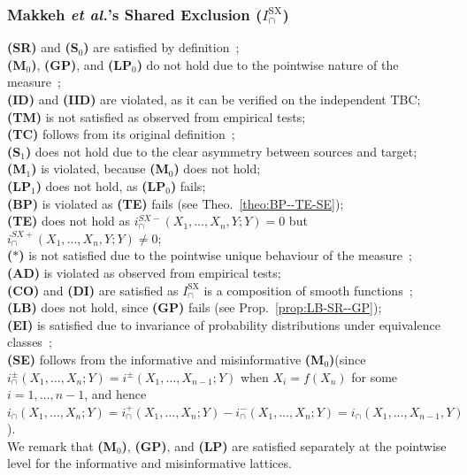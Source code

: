 \documentclass{article}
\makeatletter
\newcommand{\etalx}{\textit{et al.\@}\xspace}
\newcommand{\ts}[1]{\ensuremath{_{\text{#1}}}}
\newcommand{\Xs}{X_1,\ldots,X_n}
\newcommand{\Xsm}{X_1,\ldots,X_{n-1}}
\newcommand{\SR}{\textbf{(SR)}\xspace} %
\newcommand{\Sz}{\textbf{(S\ts{0})}\xspace} %
\newcommand{\Mz}{\textbf{(M\ts{0})}\xspace} %
\newcommand{\GP}{\textbf{(GP)}\xspace} %
\newcommand{\LPz}{\textbf{(LP\ts{0})}\xspace} %
\newcommand{\ID}{\textbf{(ID)}\xspace} %
\newcommand{\IID}{\textbf{(IID)}\xspace} %
\newcommand{\TM}{\textbf{(TM)}\xspace} %
\newcommand{\TC}{\textbf{(TC)}\xspace} %
\newcommand{\So}{\textbf{(S\ts{1})}\xspace} %
\newcommand{\Mo}{\textbf{(M\ts{1})}\xspace} %
\newcommand{\LPo}{\textbf{(LP\ts{1})}\xspace} %
\newcommand{\BP}{\textbf{(BP)}\xspace} %
\newcommand{\TE}{\textbf{(TE)}\xspace} %
\newcommand{\AST}{\textbf{($\boldsymbol{\ast}$)}\xspace} %
\newcommand{\AD}{\textbf{(AD)}\xspace} %
\newcommand{\CO}{\textbf{(CO)}\xspace} %
\newcommand{\LB}{\textbf{(LB)}\xspace} %
\newcommand{\EI}{\textbf{(EI)}\xspace} %
\newcommand{\SE}{\textbf{(SE)}\xspace} %
\newcommand{\LP}{\textbf{(LP)}\xspace}
\newcommand{\DI}{\textbf{(DI)}\xspace}
\newcommand{\ISX}{\ensuremath{I_\cap^{\text{SX}}}\xspace}
\makeatother
\begin{document}
\subsubsection*{Makkeh \etalx's Shared Exclusion ($\ISX$)}
    \SR and \Sz are satisfied by definition~\cite{makkeh2021introducing}; \\
    \Mz, \GP, and \LPz do not hold due to the pointwise nature of the measure~\cite{makkeh2021introducing}; \\
    \ID and \IID are violated, as it can be verified on the independent TBC; \\
    \TM is not satisfied as observed from empirical tests; \\
    \TC follows from its original definition~\cite{makkeh2021introducing}; \\
    \So does not hold due to the clear asymmetry between sources and target; \\
    \Mo is violated, because \Mz does not hold; \\
    \LPo does not hold, as \LPz fails; \\
    \BP is violated as \TE fails (see Theo.~\ref{theo:BP--TE-SE}); \\
    \TE does not hold as $i_\cap^{SX-}(\Xs,Y;Y)=0$ but $i_\cap^{SX+}(\Xs,Y;Y)\ne0$; \\
    \AST is not satisfied due to the pointwise unique behaviour of the measure~\cite{makkeh2021introducing}; \\
    \AD is violated as observed from empirical tests; \\
    \CO and \DI are satisfied as \ISX is a composition of smooth functions~\cite{makkeh2021introducing}; \\
    \LB does not hold, since \GP fails (see Prop.~\ref{prop:LB-SR--GP}); \\
    \EI is satisfied due to invariance of probability distributions under equivalence classes~\cite{li2011connection}; \\
    \SE follows from the informative and misinformative \Mz (since $i_\cap^\pm(\Xs;Y)=i^\pm(\Xsm;Y)$ when  $X_i=f(X_n)$ for some $i=1,\ldots,n-1$, and hence $i_\cap(\Xs;Y)=i_\cap^+(\Xs;Y)-i_\cap^-(\Xs;Y)=i_\cap(\Xsm,Y)$). \\
    We remark that \Mz, \GP, and \LP are satisfied separately at the pointwise level for the informative and misinformative lattices.
    
\end{document}
